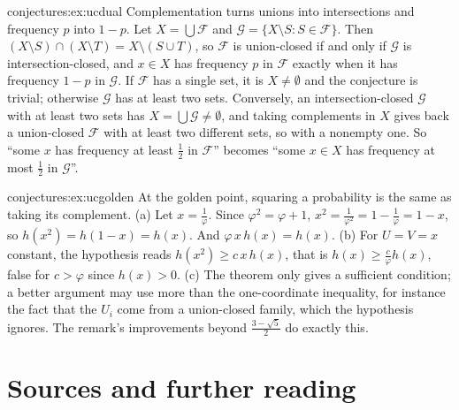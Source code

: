 \begin{solution}{conjectures:ex:ucdual}
\idea Complementation turns unions into intersections and frequency $p$ into $1-p$.
\writeup Let $X=\bigcup\mathcal F$ and $\mathcal G=\{X\setminus S:S\in\mathcal F\}$. Then $(X\setminus S)\cap(X\setminus T)=X\setminus(S\cup T)$, so
$\mathcal F$ is union-closed if and only if $\mathcal G$ is intersection-closed, and $x\in X$ has frequency $p$ in $\mathcal F$ exactly when it has
frequency $1-p$ in $\mathcal G$. If $\mathcal F$ has a single set, it is $X\neq\emptyset$ and the conjecture is trivial; otherwise $\mathcal G$ has
at least two sets. Conversely, an intersection-closed $\mathcal G$ with at least two sets has $X=\bigcup\mathcal G\ne\emptyset$, and taking complements
in $X$ gives back a union-closed $\mathcal F$ with at least two different sets, so with a nonempty one. So ``some $x$ has frequency at least $\frac12$
in $\mathcal F$'' becomes ``some $x\in X$ has frequency at most $\frac12$ in $\mathcal G$''.
\end{solution}

\begin{solution}{conjectures:ex:ucgolden}
\idea At the golden point, squaring a probability is the same as taking its complement.
\writeup (a) Let $x=\frac1\varphi$. Since $\varphi^2=\varphi+1$, $x^2=\frac1{\varphi^2}=1-\frac1\varphi=1-x$, so $h(x^2)=h(1-x)=h(x)$. And
$\varphi\,x\,h(x)=h(x)$. (b) For $U=V=x$ constant, the hypothesis reads $h(x^2)\ge c\,x\,h(x)$, that is $h(x)\ge\frac c\varphi h(x)$, false for $c>\varphi$
since $h(x)>0$. (c) The theorem only gives a sufficient condition; a better argument may use more than the one-coordinate inequality, for instance
the fact that the $U_i$ come from a union-closed family, which the hypothesis ignores. The remark's improvements beyond $\frac{3-\sqrt5}2$ do exactly this.
\end{solution}

\section*{Sources and further reading}


